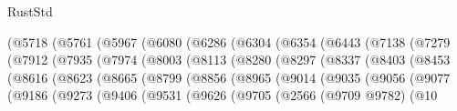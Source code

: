 \begin{lexlean}{RustStd}
\begin{coremodule}
{\begin{coremodule}
{{{{{{{{{{{{{{{{{{{{{{{{{{{{{{{{{{{{{{{{{{{{{{{{{{{{{{{{{{{{{{{{{{{{{{{{{{{{{{                    (@5718
                      (@5761
                        (@5967
                          (@6080
                            (@6286
                              (@6304
                                (@6354
                                  (@6443
                                    (@7138
                                      (@7279
                                        (@7912
                                          (@7935
                                            (@7974
                                              (@8003
                                                (@8113
                                                  (@8280
                                                    (@8297
                                                      (@8337
                                                        (@8403
                                                          (@8453
                                                            (@8616
                                                              (@8623
                                                                (@8665
                                                                  (@8799
                                                                    (@8856
                                                                      (@8965
                                                                        (@9014
                                                                          (@9035
                                                                            (@9056
                                                                              (@9077
                                                                                (@9186
                                                                                  (@9273
                                                                                    (@9406
                                                                                      (@9531
                                                                                        (@9626
                                                                                          (@9705
                                                                                            (@2566
                                                                                              (@9709
                                                                                                @9782)
                                                                                              (@10
}}}}}}}}}}}}}}}}}}}}}}}}}}}}}}}}}}}}}}}}}}}}}}}}}}}}}}}}}}}}}}}}}}}}}}}}}}}}}}
\end{coremodule}}
\end{coremodule}
\end{lexlean}
